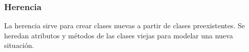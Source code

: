 \begin{frame}[fragile]
  \frametitle{Herencia}


  La herencia sirve para crear clases nuevas a partir de clases preexistentes.
  Se heredan atributos y m\'etodos de las clases viejas  para modelar una nueva situaci\'on.
   
\end{frame}
